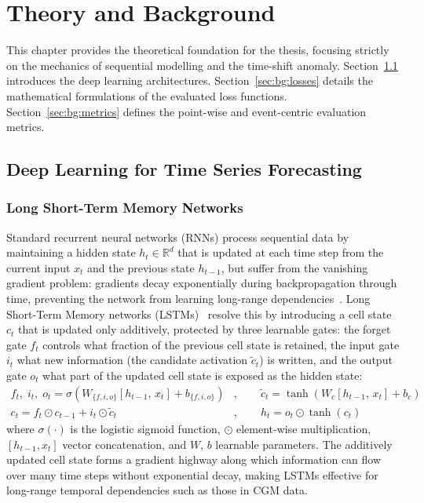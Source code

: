 \chapter{Theory and Background} \label{ch:background}
This chapter provides the theoretical foundation for the thesis, focusing strictly on the mechanics of sequential modelling and the time-shift anomaly. Section~\ref{sec:bg:models} introduces the deep learning architectures. Section~\ref{sec:bg:losses} details the mathematical formulations of the evaluated loss functions. Section~\ref{sec:bg:metrics} defines the point-wise and event-centric evaluation metrics.

\section{Deep Learning for Time Series Forecasting} \label{sec:bg:models}
\subsection{Long Short-Term Memory Networks} \label{sec:bg:models:lstm}

Standard recurrent neural networks (RNNs) process sequential data by maintaining a hidden state $h_t \in \mathbb{R}^d$ that is updated at each time step from the current input $x_t$ and the previous state $h_{t-1}$, but suffer from the vanishing gradient problem: gradients decay exponentially during backpropagation through time, preventing the network from learning long-range dependencies~\citep{bengio1994vanishing}. Long Short-Term Memory networks (LSTMs)~\citep{hochreiter1997lstm} resolve this by introducing a cell state $c_t$ that is updated only additively, protected by three learnable gates: the forget gate $f_t$ controls what fraction of the previous cell state is retained, the input gate $i_t$ what new information (the candidate activation $\tilde{c}_t$) is written, and the output gate $o_t$ what part of the updated cell state is exposed as the hidden state:
\begin{align}
    f_t,\; i_t,\; o_t = \sigma\!\left(W_{\{f,i,o\}} [h_{t-1},\, x_t] + b_{\{f,i,o\}}\right)&, \qquad
    \tilde{c}_t = \tanh\!\left(W_c [h_{t-1},\, x_t] + b_c\right) \label{eq:lstm_gates} \\
    c_t = f_t \odot c_{t-1} + i_t \odot \tilde{c}_t&, \qquad
    h_t = o_t \odot \tanh(c_t) \label{eq:lstm_state}
\end{align}
where $\sigma(\cdot)$ is the logistic sigmoid function, $\odot$ element-wise multiplication, $[h_{t-1}, x_t]$ vector concatenation, and $W$, $b$ learnable parameters. The additively updated cell state forms a gradient highway along which information can flow over many time steps without exponential decay, making LSTMs effective for long-range temporal dependencies such as those in CGM data.

